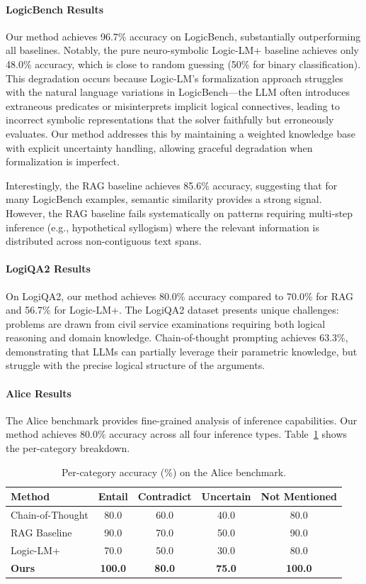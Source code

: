 \paragraph{LogicBench Results} Our method achieves 96.7\% accuracy on LogicBench, substantially outperforming all baselines. Notably, the pure neuro-symbolic Logic-LM+ baseline achieves only 48.0\% accuracy, which is close to random guessing (50\% for binary classification). This degradation occurs because Logic-LM's formalization approach struggles with the natural language variations in LogicBench---the LLM often introduces extraneous predicates or misinterprets implicit logical connectives, leading to incorrect symbolic representations that the solver faithfully but erroneously evaluates. Our method addresses this by maintaining a weighted knowledge base with explicit uncertainty handling, allowing graceful degradation when formalization is imperfect.

Interestingly, the RAG baseline achieves 85.6\% accuracy, suggesting that for many LogicBench examples, semantic similarity provides a strong signal. However, the RAG baseline fails systematically on patterns requiring multi-step inference (e.g., hypothetical syllogism) where the relevant information is distributed across non-contiguous text spans.

\paragraph{LogiQA2 Results} On LogiQA2, our method achieves 80.0\% accuracy compared to 70.0\% for RAG and 56.7\% for Logic-LM+. The LogiQA2 dataset presents unique challenges: problems are drawn from civil service examinations requiring both logical reasoning and domain knowledge. Chain-of-thought prompting achieves 63.3\%, demonstrating that LLMs can partially leverage their parametric knowledge, but struggle with the precise logical structure of the arguments.

\paragraph{Alice Results} The Alice benchmark provides fine-grained analysis of inference capabilities. Our method achieves 80.0\% accuracy across all four inference types. Table~\ref{tab:alice_breakdown} shows the per-category breakdown.

\begin{table}[t]
\centering
\caption{Per-category accuracy (\%) on the Alice benchmark.}
\label{tab:alice_breakdown}
\begin{tabular}{lcccc}
\toprule
\textbf{Method} & \textbf{Entail} & \textbf{Contradict} & \textbf{Uncertain} & \textbf{Not Mentioned} \\
\midrule
Chain-of-Thought & 80.0 & 60.0 & 40.0 & 80.0 \\
RAG Baseline & 90.0 & 70.0 & 50.0 & 90.0 \\
Logic-LM+ & 70.0 & 50.0 & 30.0 & 80.0 \\
\textbf{Ours} & \textbf{100.0} & \textbf{80.0} & \textbf{75.0} & \textbf{100.0} \\
\bottomrule
\end{tabular}
\end{table}


